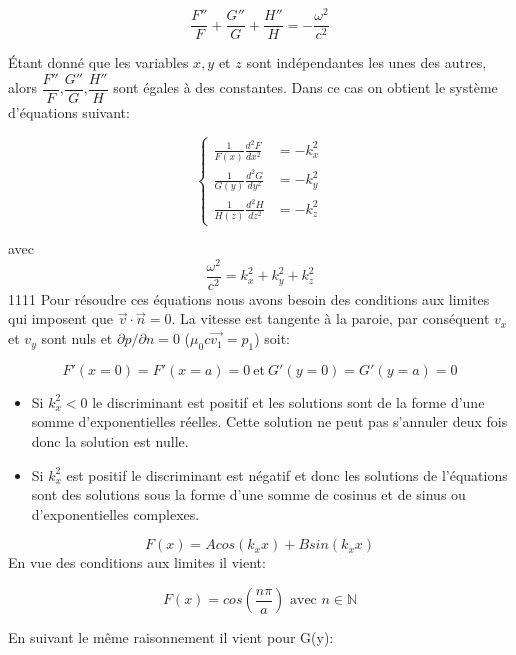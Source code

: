 \documentclass[french, a4paper, 10pt, twocolumn, landscape]{article}
\begin{document}
\[\frac{F''}{F} + \frac{G''}{G} +\frac{H''}{H}=-\frac{\omega^2}{c^2}\]

Étant donné que les variables $x,y$ et $z$ sont indépendantes les unes des autres, alors $\dfrac{F''}{F}$,$\dfrac{G''}{G}$,$\dfrac{H''}{H}$ sont égales à des constantes. Dans ce cas on obtient le système d'équations suivant: 

\begin{equation}
    \left\{
    \begin{array}{ll}
        
	\frac{1}{F(x)}\frac{d^2 F}{dx^2} &=-k_x^2 \\
	\frac{1}{G(y)}\frac{d^2 G}{dy^2} &=-k_y^2 \\
	\frac{1}{H(z)}\frac{d^2 H}{dz^2} &=-k_z^2

\end{array}
    \right.
\end{equation}

avec  $$\dfrac{\omega^2}{c^2}= k_x^2+k_y^2+k_z^2$$
1111
Pour résoudre ces équations nous avons besoin des conditions aux limites qui imposent que $\vec{v}\cdot \vec{n} = 0$. La vitesse est tangente à la paroie, par conséquent $v_x$ et $v_y$ sont nuls et $\partial p/\partial n = 0$  ($\mu_0 c \vec{v_1} = p_1$) soit:

$$F'(x=0)=F'(x=a)= 0~\text{et}~ G'(y=0)=G'(y=a)=0$$


\begin{itemize}
    \item Si $k_x^2<0$ le discriminant est positif et les solutions sont de la forme d'une somme d'exponentielles réelles. Cette solution ne peut pas s'annuler deux fois donc la solution est nulle.
    \item Si $k_x^2$ est positif le discriminant est négatif et donc les solutions de l'équations sont des solutions sous la forme d'une somme de cosinus et de sinus ou d'exponentielles complexes.
\end{itemize}

\begin{equation}
	F(x) = Acos(k_x x) + Bsin(k_x x)
\end{equation}
En vue des conditions aux limites il vient:

\begin{equation}
	F(x) = cos\left(\frac{n\pi}{a}\right) \textrm{ avec } n\in\mathbb{N}
\end{equation}

En suivant le même raisonnement il vient pour G(y):
\end{document}

